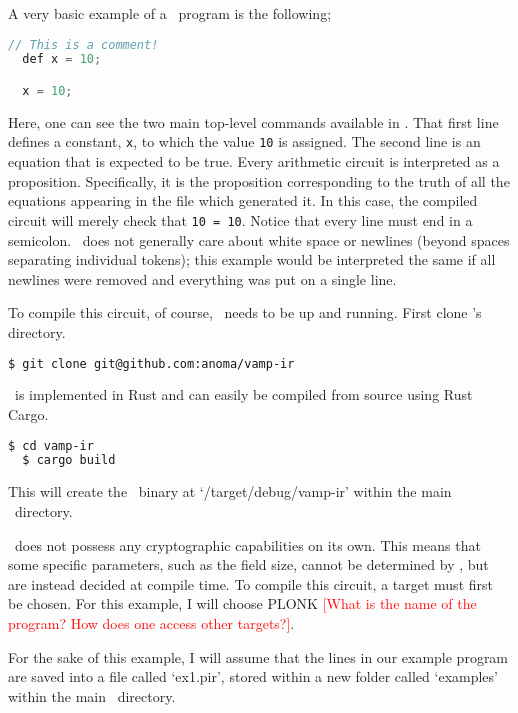 A very basic example of a \vampir\ program is the following;

\begin{lstlisting}[language=c]
  // This is a comment!
  def x = 10;

  x = 10;
\end{lstlisting}

Here, one can see the two main top-level commands available in \vampir. That first line defines a constant, \lstinline{x}, to which the value \lstinline{10} is assigned. The second line is an equation that is expected to be true. Every arithmetic circuit is interpreted as a proposition. Specifically, it is the proposition corresponding to the truth of all the equations appearing in the file which generated it. In this case, the compiled circuit will merely check that \lstinline{10 = 10}. Notice that every line must end in a semicolon. \vampir\ does not generally care about white space or newlines (beyond spaces separating individual tokens); this example would be interpreted the same if all newlines were removed and everything was put on a single line.

To compile this circuit, of course, \vampir\ needs to be up and running. First clone \vampir's directory.

\begin{lstlisting}[language=bash]
  $ git clone git@github.com:anoma/vamp-ir
\end{lstlisting}

\vampir\ is implemented in Rust and can easily be compiled from source using Rust Cargo.

\begin{lstlisting}[language=bash]
  $ cd vamp-ir
  $ cargo build
\end{lstlisting}

This will create the \vampir\ binary at `/target/debug/vamp-ir' within the main \vampir\ directory.

\vampir\ does not possess any cryptographic capabilities on its own. This means that some specific parameters, such as the field size, cannot be determined by \vampir, but are instead decided at compile time. To compile this circuit, a target must first be chosen. For this example, I will choose PLONK \textcolor{red}{[What is the name of the program? How does one access other targets?]}.

For the sake of this example, I will assume that the lines in our example program are saved into a file called `ex1.pir', stored within a new folder called `examples' within the main \vampir\ directory. 

